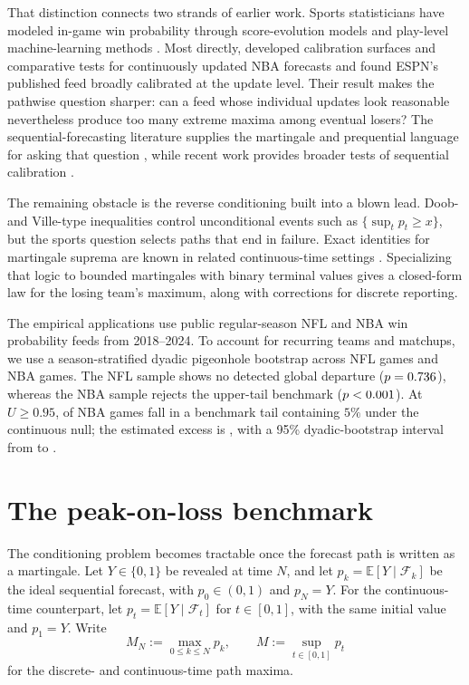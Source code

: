 \documentclass[12pt,letterpaper]{article}  %
\newcommand{\E}{\mathbb{E}}
\theoremstyle{plain}
\theoremstyle{definition}
\begin{document}
That distinction connects two strands of earlier work.
Sports statisticians have modeled in-game win probability through score-evolution models \citep{Stern1994} and play-level machine-learning methods \citep{LockNettleton2014,YurkoVenturaHorowitz2019}.
Most directly, \citet{YehRiceDubin2022} developed calibration surfaces and comparative tests for continuously updated NBA forecasts and found ESPN's published feed broadly calibrated at the update level.
Their result makes the pathwise question sharper: can a feed whose individual updates look reasonable nevertheless produce too many extreme maxima among eventual losers?
The sequential-forecasting literature supplies the martingale and prequential language for asking that question \citep{Dawid1984,FosterVohra1998}, while recent work provides broader tests of sequential calibration \citep[e.g.,][]{Howard2020,RamdasGrunwaldVovkShafer2023,ArnoldHenziZiegel2023}.

The remaining obstacle is the reverse conditioning built into a blown lead.
Doob- and Ville-type inequalities control unconditional events such as $\{\sup_t p_t\ge x\}$, but the sports question selects paths that end in failure.
Exact identities for martingale suprema are known in related continuous-time settings \citep{NikeghbaliYor2006}.
Specializing that logic to bounded martingales with binary terminal values gives a closed-form law for the losing team's maximum, along with corrections for discrete reporting.

The empirical applications use public regular-season NFL and NBA win probability feeds from 2018--2024.
To account for recurring teams and matchups, we use a season-stratified dyadic pigeonhole bootstrap across \NFLGames{} NFL games and \NBAGames{} NBA games.
The NFL sample shows no detected global departure ($p=0.736$), whereas the NBA sample rejects the upper-tail benchmark ($p<0.001$).
At $U\ge0.95$, \NBATailNinetyFiveRate{} of NBA games fall in a benchmark tail containing $5\%$ under the continuous null; the estimated excess is \NBATailNinetyFiveExcess{}, with a 95\% dyadic-bootstrap interval from \NBATailNinetyFiveCILower{} to \NBATailNinetyFiveCIUpper{}.

\section{The peak-on-loss benchmark} \label{sec:theory}

The conditioning problem becomes tractable once the forecast path is written as a martingale.
Let $Y\in\{0,1\}$ be revealed at time $N$, and let $p_k=\E[Y\mid\mathcal F_k]$ be the ideal sequential forecast, with $p_0\in(0,1)$ and $p_N=Y$.
For the continuous-time counterpart, let $p_t=\E[Y\mid\mathcal F_t]$ for $t\in[0,1]$, with the same initial value and $p_1=Y$.
Write
\[
M_N := \max_{0\le k\le N} p_k,
\qquad
M := \sup_{t\in[0,1]} p_t
\]
for the discrete- and continuous-time path maxima.
\end{document}
